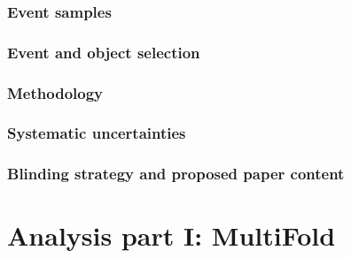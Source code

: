 \documentclass[NOTE, atlasdraft=true, texlive=2016, UKenglish]{\ATLASLATEXPATH atlasdoc}
\begin{document}
\maketitle

\tableofcontents


\clearpage


\section{Event samples}
\label{sec:samples}


\section{Event and object selection}
\label{sec:objects}

\newpage


\section{Methodology}
\label{sec:strategy}



\clearpage

\section{Systematic uncertainties}
\label{sec:uncerts}



\section{Blinding strategy and proposed paper content}


\clearpage

\part{Analysis part I: MultiFold}
\label{part:multifold}
\end{document}
